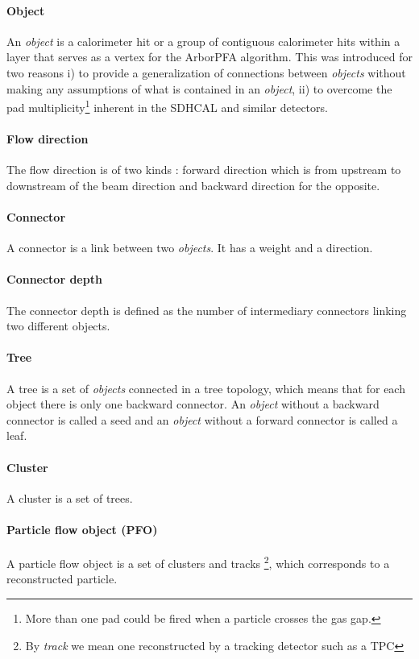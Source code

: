 \documentclass[12pt]{article}
\begin{document}
\paragraph*{Object} An \textit{object} is a calorimeter hit or a group of contiguous calorimeter hits within a layer that serves as a vertex for the ArborPFA algorithm. This was introduced for two reasons i) to provide a generalization of connections between \textit{objects} without making any assumptions of what is contained in an \textit{object}, ii) to overcome the pad multiplicity\footnote{More than one pad could be fired when a particle crosses the gas gap.} inherent in the SDHCAL \cite{sdhcal-paper} and similar detectors.

\paragraph*{Flow direction} The flow direction is of two kinds : forward direction which is from upstream to downstream of the beam direction and backward direction for the opposite.

\paragraph*{Connector} A connector is a link between two \textit{objects}. It has a weight and a direction.

\paragraph*{Connector depth} The connector depth is defined as the number of intermediary connectors linking two different objects.

\paragraph*{Tree} A tree is a set of \textit{objects} connected in a tree topology, which means that for each object there is only one backward connector. An \textit{object} without a backward connector is called a seed and an \textit{object} without a forward connector is called a leaf.

\paragraph*{Cluster} A cluster is a set of trees.

\paragraph*{Particle flow object (PFO)} A particle flow object is a set of clusters and tracks \footnote{By \textit{track} we mean one reconstructed by a tracking detector such as a TPC}, which corresponds to a reconstructed particle.
\end{document}
